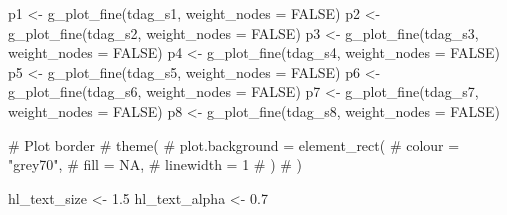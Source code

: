 \documentclass[
  letterpaper,
  DIV=11,
  numbers=noendperiod]{scrartcl}
\newenvironment{Shaded}{\begin{snugshade}}{\end{snugshade}}
\newcommand{\AttributeTok}[1]{\textcolor[rgb]{0.40,0.45,0.13}{#1}}
\newcommand{\CommentTok}[1]{\textcolor[rgb]{0.37,0.37,0.37}{#1}}
\newcommand{\ConstantTok}[1]{\textcolor[rgb]{0.56,0.35,0.01}{#1}}
\newcommand{\FloatTok}[1]{\textcolor[rgb]{0.68,0.00,0.00}{#1}}
\newcommand{\FunctionTok}[1]{\textcolor[rgb]{0.28,0.35,0.67}{#1}}
\newcommand{\NormalTok}[1]{\textcolor[rgb]{0.00,0.23,0.31}{#1}}
\newcommand{\OtherTok}[1]{\textcolor[rgb]{0.00,0.23,0.31}{#1}}
\begin{document}
\begin{Shaded}
\begin{Highlighting}[]
\NormalTok{p1 }\OtherTok{\textless{}{-}} \FunctionTok{g\_plot\_fine}\NormalTok{(tdag\_s1, }\AttributeTok{weight\_nodes =} \ConstantTok{FALSE}\NormalTok{)}
\NormalTok{p2 }\OtherTok{\textless{}{-}} \FunctionTok{g\_plot\_fine}\NormalTok{(tdag\_s2, }\AttributeTok{weight\_nodes =} \ConstantTok{FALSE}\NormalTok{)}
\NormalTok{p3 }\OtherTok{\textless{}{-}} \FunctionTok{g\_plot\_fine}\NormalTok{(tdag\_s3, }\AttributeTok{weight\_nodes =} \ConstantTok{FALSE}\NormalTok{)}
\NormalTok{p4 }\OtherTok{\textless{}{-}} \FunctionTok{g\_plot\_fine}\NormalTok{(tdag\_s4, }\AttributeTok{weight\_nodes =} \ConstantTok{FALSE}\NormalTok{)}
\NormalTok{p5 }\OtherTok{\textless{}{-}} \FunctionTok{g\_plot\_fine}\NormalTok{(tdag\_s5, }\AttributeTok{weight\_nodes =} \ConstantTok{FALSE}\NormalTok{)}
\NormalTok{p6 }\OtherTok{\textless{}{-}} \FunctionTok{g\_plot\_fine}\NormalTok{(tdag\_s6, }\AttributeTok{weight\_nodes =} \ConstantTok{FALSE}\NormalTok{)}
\NormalTok{p7 }\OtherTok{\textless{}{-}} \FunctionTok{g\_plot\_fine}\NormalTok{(tdag\_s7, }\AttributeTok{weight\_nodes =} \ConstantTok{FALSE}\NormalTok{)}
\NormalTok{p8 }\OtherTok{\textless{}{-}} \FunctionTok{g\_plot\_fine}\NormalTok{(tdag\_s8, }\AttributeTok{weight\_nodes =} \ConstantTok{FALSE}\NormalTok{)}

\CommentTok{\# Plot border }
    \CommentTok{\# theme(}
    \CommentTok{\#   plot.background = element\_rect(}
    \CommentTok{\#     colour = "grey70", }
    \CommentTok{\#     fill = NA,}
    \CommentTok{\#     linewidth = 1}
    \CommentTok{\#   )}
    \CommentTok{\# )}

\NormalTok{hl\_text\_size }\OtherTok{\textless{}{-}} \FloatTok{1.5}
\NormalTok{hl\_text\_alpha }\OtherTok{\textless{}{-}} \FloatTok{0.7}


\end{Highlighting}
\end{Shaded}
\end{document}
